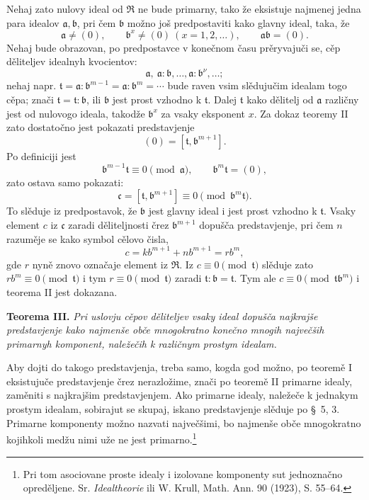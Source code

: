 \documentclass[11pt]{article}
\providecommand{\mR}{\mathfrak{R}}
\providecommand{\ma}{\mathfrak{a}}
\providecommand{\mb}{\mathfrak{b}}
\providecommand{\mc}{\mathfrak{c}}
\providecommand{\mt}{\mathfrak{t}}
\begin{document}
Nehaj zato nulovy ideal od $\mR$ ne bude primarny, tako že eksistuje najmenej jedna para idealov $\ma,\mb$, pri čem $\mb$ možno još predpostaviti kako glavny ideal, taka, že
\[
\ma\ne(0),\qquad \mb^x\ne(0)\ (x=1,2,\ldots),
\qquad \ma\mb=(0).
\]
Nehaj bude obrazovan, po predpostavce v konečnom času prěryvajuči se, cěp děliteljev idealnyh kvocientov:
\[
\ma,\ \ma:\mb,\ldots,\ma:\mb^\nu,\ldots;
\]
nehaj napr. $\mt=\ma:\mb^{m-1}=\ma:\mb^m=\cdots$ bude raven vsim slědujučim idealam togo cěpa; znači $\mt=\mt:\mb$, ili $\mb$ jest prost vzhodno k $\mt$. Dalej $\mt$ kako dělitelj od $\ma$ različny jest od nulovogo ideala, takodže $\mb^x$ za vsaky eksponent $x$. Za dokaz teoremy II zato dostatočno jest pokazati predstavjenje
\[
(0)=[\mt,\mb^{m+1}].
\]
Po definiciji jest
\[
\mb^{m-1}\mt\equiv0\pmod{\ma},\qquad \mb^m\mt=(0),
\]
zato ostava samo pokazati:
\[
\mc=[\mt,\mb^{m+1}]\equiv0\pmod{\mb^m\mt}.
\]
To slěduje iz predpostavok, že $\mb$ jest glavny ideal i jest prost vzhodno k $\mt$. Vsaky element $c$ iz $\mc$ zaradi děliteljnosti črez $\mb^{m+1}$ dopušča predstavjenje, pri čem $n$ razuměje se kako symbol cělovo čisla,
\[
 c=k b^{m+1}+n b^{m+1}=r b^m,
\]
gde $r$ nyně znovo označaje element iz $\mR$. Iz $c\equiv0\pmod{\mt}$ slěduje zato $r b^m\equiv0\pmod{\mt}$ i tym $r\equiv0\pmod{\mt}$ zaradi $\mt:\mb=\mt$. Tym ale $c\equiv0\pmod{\mt\mb^m}$ i teorema II jest dokazana.

\textbf{Teorema III.} \emph{Pri uslovju cěpov děliteljev vsaky ideal dopušča najkrajše predstavjenje kako najmenše obče mnogokratno konečno mnogih največših primarnyh komponent, naležečih k različnym prostym idealam.}

Aby dojti do takogo predstavjenja, treba samo, kogda god možno, po teoremě I eksistujuče predstavjenje črez nerazložime, znači po teoremě II primarne idealy, zaměniti s najkrajšim predstavjenjem. Ako primarne idealy, naležeče k jednakym prostym idealam, sobirajut se skupaj, iskano predstavjenje slěduje po \S~5, 3. Primarne komponenty možno nazvati največšimi, bo najmenše obče mnogokratno kojihkoli medžu nimi uže ne jest primarno.\footnote{Pri tom asociovane proste idealy i izolovane komponenty sut jednoznačno opreděljene. Sr. \emph{Idealtheorie} ili W. Krull, Math. Ann. 90 (1923), S. 55--64.}
\end{document}
